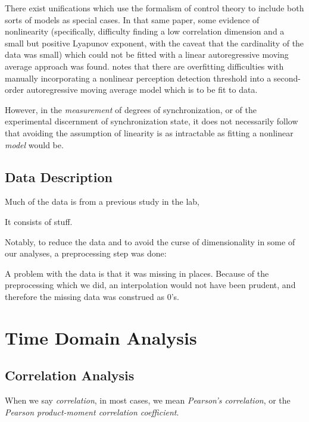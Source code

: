 \documentclass[12pt]{article}
\begin{document}
There exist unifications \cite{pressing} which use the formalism of control theory to include both sorts of models as special cases. In that same paper, some evidence of nonlinearity (specifically, difficulty finding a low correlation dimension and a small but positive Lyapunov exponent, with the caveat that the cardinality of the data was small) which could not be fitted with a linear autoregressive moving average approach was found. \cite{schulze} notes that there are overfitting difficulties with manually incorporating a nonlinear perception detection threshold into a second-order autoregressive moving average model which is to be fit to data.

However, in the \emph{measurement} of degrees of synchronization, or of the experimental discernment of synchronization state, it does not necessarily follow that avoiding the assumption of linearity is as intractable as fitting a nonlinear \emph{model} would be.


\subsection{Data Description}

Much of the data is from a previous study in the lab, %

It consists of stuff. %

Notably, to reduce the data and to avoid the curse of dimensionality in some of our analyses, a preprocessing step was done: %

A problem with the data is that it was missing in places. Because of the preprocessing which we did, an interpolation would not have been prudent, and therefore the missing data was construed as 0's. %

\section{Time Domain Analysis}

\subsection{Correlation Analysis}

When we say \emph{correlation}, in most cases, we mean \emph{Pearson's correlation}, or the \emph{Pearson product-moment correlation coefficient}.
\end{document}
